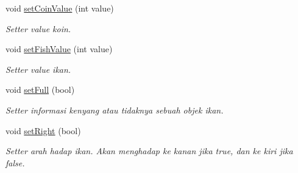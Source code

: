 \begin{DoxyCompactItemize}
void \hyperlink{classFish_ab61f43526d46c7edeee730be29c1eba0}{set\+Coin\+Value} (int value)
\begin{DoxyCompactList}\small\item\em Setter value koin. \end{DoxyCompactList}\item 
\mbox{\label{classFish_af8633a8e349a04e3e1b4ee39e119b1e7}} 
void \hyperlink{classFish_af8633a8e349a04e3e1b4ee39e119b1e7}{set\+Fish\+Value} (int value)
\begin{DoxyCompactList}\small\item\em Setter value ikan. \end{DoxyCompactList}\item 
\mbox{\label{classFish_aeb2dc6cb0b3e0b57a8e458824fdd1d5d}} 
void \hyperlink{classFish_aeb2dc6cb0b3e0b57a8e458824fdd1d5d}{set\+Full} (bool)
\begin{DoxyCompactList}\small\item\em Setter informasi kenyang atau tidaknya sebuah objek ikan. \end{DoxyCompactList}\item 
\mbox{\label{classFish_ad20d93cc7fdc5f560a06d120263feff6}} 
void \hyperlink{classFish_ad20d93cc7fdc5f560a06d120263feff6}{set\+Right} (bool)
\begin{DoxyCompactList}\small\item\em Setter arah hadap ikan. Akan menghadap ke kanan jika true, dan ke kiri jika false. \end{DoxyCompactList}\end{DoxyCompactItemize}
